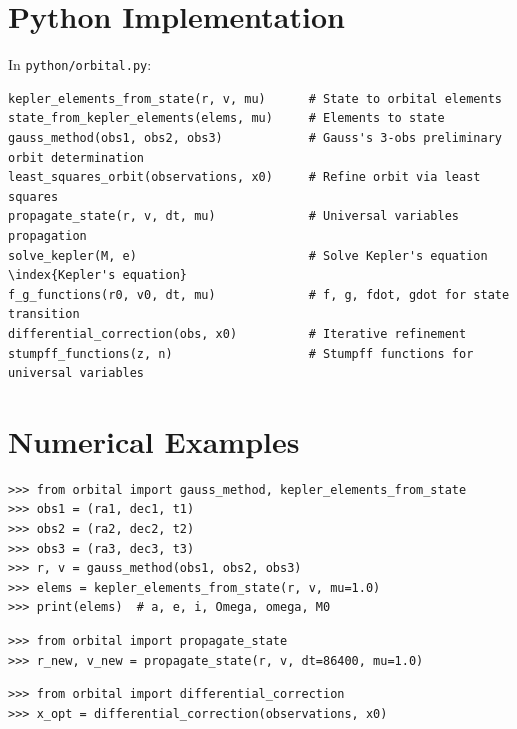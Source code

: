 \section{Python Implementation}

In \texttt{python/orbital.py}:

\begin{lstlisting}[style=python, caption={Key functions in python/orbital.py}]
kepler_elements_from_state(r, v, mu)      # State to orbital elements
state_from_kepler_elements(elems, mu)     # Elements to state
gauss_method(obs1, obs2, obs3)            # Gauss's 3-obs preliminary orbit determination
least_squares_orbit(observations, x0)     # Refine orbit via least squares
propagate_state(r, v, dt, mu)             # Universal variables propagation
solve_kepler(M, e)                        # Solve Kepler's equation \index{Kepler's equation}
f_g_functions(r0, v0, dt, mu)             # f, g, fdot, gdot for state transition
differential_correction(obs, x0)          # Iterative refinement
stumpff_functions(z, n)                   # Stumpff functions for universal variables
\end{lstlisting}

\section{Numerical Examples}

\begin{example}
\begin{lstlisting}[style=python]
>>> from orbital import gauss_method, kepler_elements_from_state
>>> obs1 = (ra1, dec1, t1)
>>> obs2 = (ra2, dec2, t2)
>>> obs3 = (ra3, dec3, t3)
>>> r, v = gauss_method(obs1, obs2, obs3)
>>> elems = kepler_elements_from_state(r, v, mu=1.0)
>>> print(elems)  # a, e, i, Omega, omega, M0
\end{lstlisting}
\end{example}

\begin{example}
\begin{lstlisting}[style=python]
>>> from orbital import propagate_state
>>> r_new, v_new = propagate_state(r, v, dt=86400, mu=1.0)
\end{lstlisting}
\end{example}

\begin{example}
\begin{lstlisting}[style=python]
>>> from orbital import differential_correction
>>> x_opt = differential_correction(observations, x0)
\end{lstlisting}
\end{example}

